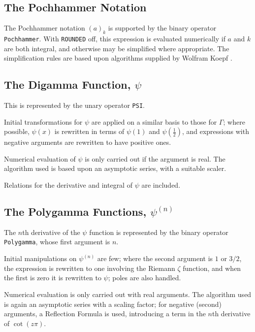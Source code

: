 \subsection{The Pochhammer Notation}

The Pochhammer notation $(a)_k$ is supported by the binary operator {\tt
Pochhammer}.  With {\tt ROUNDED} off, this expression is evaluated
numerically if $a$ and $k$ are both integral, and otherwise may be
simplified where appropriate.  The simplification rules are based upon
algorithms supplied by Wolfram Koepf \cite{Koepf:92}.



\subsection{The Digamma Function, $\psi$}

This is represented by the unary operator {\tt PSI}.

Initial transformations for $\psi$ are applied on a similar basis to
those for $\Gamma$; where possible, $\psi(x)$ is rewritten in
terms of $\psi(1)$ and $\psi(\frac{1}{2})$, and expressions with negative
arguments are rewritten to have positive ones.

Numerical evaluation of $\psi$ is only carried out if the argument is
real. The algorithm used is based upon an asymptotic series, with a
suitable scaler.

Relations for the derivative and integral of $\psi$ are included.


\subsection{The Polygamma Functions, $\psi^{(n)}$}

The $n$th derivative of the $\psi$ function is represented by the
binary operator {\tt Polygamma}, whose first argument is $n$.

Initial manipulations on $\psi^{(n)}$ are few; where the second argument
is $1$ or $3/2$, the expression is rewritten to one involving the
Riemann $\zeta$ function, and when the first is zero it is rewritten to
$\psi$; poles are also handled.

Numerical evaluation is only carried out with real arguments. The
algorithm used is again an asymptotic series with a scaling factor; for
negative (second) arguments, a Reflection Formula is used, introducing a
term in the $n$th derivative of $\cot(z\pi)$.

